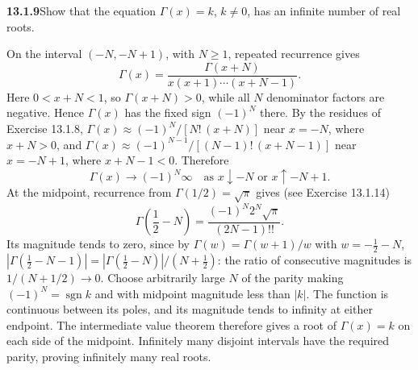 \par\bigskip
\noindent\textbf{13.1.9}\quad Show that the equation $\Gamma(x)=k$, $k\neq0$,
has an infinite number of real roots.
\par\smallskip
{}
\solution
{}
On the interval $(-N,-N+1)$, with $N\ge1$, repeated recurrence gives
\[
\Gamma(x)=\frac{\Gamma(x+N)}{x(x+1)\cdots(x+N-1)}.
\]
Here $0<x+N<1$, so $\Gamma(x+N)>0$, while all $N$ denominator factors
are negative.  Hence $\Gamma(x)$ has the fixed sign $(-1)^N$ there.
By the residues of Exercise 13.1.8,
$\Gamma(x)\approx(-1)^N/[N!\,(x+N)]$ near $x=-N$, where $x+N>0$, and
$\Gamma(x)\approx(-1)^{N-1}/[(N-1)!\,(x+N-1)]$ near $x=-N+1$, where
$x+N-1<0$.  Therefore
\[
\Gamma(x)\longrightarrow(-1)^N\infty
\quad\text{as }x\downarrow-N\text{ or }x\uparrow-N+1.
\]
At the midpoint, recurrence from $\Gamma(1/2)=\sqrt\pi$ gives
(see Exercise 13.1.14)
\[
\Gamma\left(\frac12-N\right)
=\frac{(-1)^N2^N\sqrt\pi}{(2N-1)!!}.
\]
Its magnitude tends to zero, since by
$\Gamma(w)=\Gamma(w+1)/w$ with $w=-\tfrac12-N$,
$|\Gamma(\tfrac12-N-1)|=|\Gamma(\tfrac12-N)|/(N+\tfrac12)$: the ratio
of consecutive magnitudes is $1/(N+1/2)\to0$.  Choose arbitrarily
large $N$ of the parity making $(-1)^N=\operatorname{sgn}k$ and with
midpoint magnitude
less than $|k|$.  The function is continuous between its poles,
and its magnitude tends to infinity at either endpoint.  The
intermediate value theorem therefore gives a root of $\Gamma(x)=k$
on each side of the midpoint.  Infinitely many disjoint intervals
have the required parity, proving infinitely many real roots.


